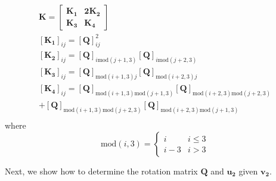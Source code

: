 \documentclass[%
reprint,
 amsmath,amssymb,
 aps,
 prb,
]{revtex4-1}
\newcommand*{\rtten}[1]{\mathbf{\boldsymbol{#1}}}
\newcommand*{\rtvec}[1]{\mathbf{#1}}
\begin{document}
\fi
\begin{gather*}
\rtten{K}=\begin{bmatrix} \rtten{K_1} & \rtten{2K_2}\\
\rtten{K_3} & \rtten{K_4}
\end{bmatrix}\\
[\rtten{K_1}]_{ij}=[\rtten{Q}]_{ij}^2\\
[\rtten{K_2}]_{ij}=[\rtten{Q}]_{i\text{mod}(j+1,3)}[\rtten{Q}]_{i\text{mod}(j+2,3)}\\
[\rtten{K_3}]_{ij}=[\rtten{Q}]_{\text{mod}(i+1,3)j}[\rtten{Q}]_{\text{mod}(i+2,3)j}\\
[\rtten{K_4}]_{ij}=[\rtten{Q}]_{\text{mod}(i+1,3)\text{mod}(j+1,3)}[\rtten{Q}]_{\text{mod}(i+2,3)\text{mod}(j+2,3)}\\
+[\rtten{Q}]_{\text{mod}(i+1,3)\text{mod}(j+2,3)}[\rtten{Q}]_{\text{mod}(i+2,3)\text{mod}(j+1,3)}\\
\end{gather*}
where 
\begin{equation*}
\text{mod}(i,3)=\begin{cases} 
i & i\leq 3\\
i-3 & i>3
\end{cases}
\end{equation*}

Next, we show how to determine the rotation matrix $\rtten{Q}$ and $\rtvec{u_2}$ given $\rtvec{v_2}$.
\end{document}
